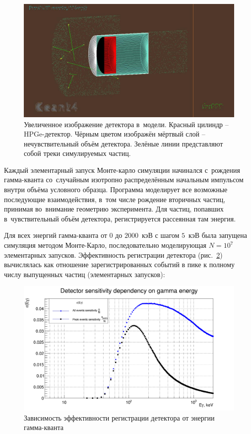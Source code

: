 \documentclass[a4paper,article,14pt]{extarticle}
\begin{document}
\begin{figure}
    \centering
    \includegraphics[width=.9\textwidth]{images/Tracks.jpg}
    \caption{Увеличенное изображение детектора в~модели.
    Красный цилиндр -- HPGe-детектор. Чёрным цветом изображён мёртвый слой -- нечувствительный объём детектора.
    Зелёные линии представляют собой треки симулируемых частиц.}\label{fig:tracks}
\end{figure}

Каждый элементарный запуск Монте-карло симуляции начинался с~рождения гамма-кванта со~случайным изотропно распределённым начальным импульсом внутри объёма условного образца.
Программа моделирует все возможные последующие взаимодействия, в~том числе рождение вторичных частиц, принимая во~внимание геометрию эксперимента.
Для частиц, попавших в~чувствительный объём детектора, регистрируется рассеянная там энергия.

Для всех энергий гамма-кванта от $0$ до $2000$~кэВ с шагом $5$~кэВ была запущена симуляция методом Монте-Карло, последовательно моделирующая $N = 10^7$ элементарных запусков.
Эффективность регистрации детектора (рис.~\ref{fig:Ey}) вычислялась как отношение зарегистрированных событий в пике к полному числу выпущенных частиц (элементарных запусков):
\begin{figure}[t]
    \centering
    \includegraphics[width = .9\textwidth]{images/DetSens.png}
    \caption{Зависимость эффективности регистрации детектора от энергии гамма-кванта}\label{fig:Ey}
\end{figure}
\end{document}
